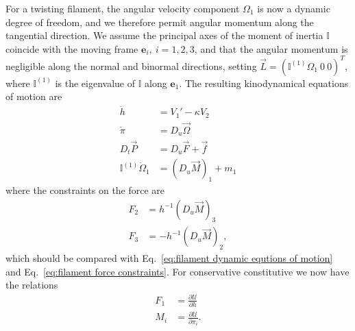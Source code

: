 For a twisting filament, the angular velocity component $\Omega_1$ is now a dynamic degree of freedom, and we therefore permit angular momentum along the tangential direction. We assume the principal axes of the moment of inertia $\mathbb{I}$ coincide with the moving frame $\mathbf{e}_i,\ i=1,2,3$, and that the angular momentum is negligible along the normal and binormal directions, setting $\vec{L} = ( \mathbb{I}^{(1)} \Omega_1\ 0\ 0 )^T$, where $\mathbb{I}^{(1)}$ is the eigenvalue of $\mathbb{I}$ along $\mathbf{e}_1$. The resulting kinodynamical equations of motion are
\begin{subequations} \label{eq:twisting filament dynamic equtions of motion}
\begin{align}
\dot{h} & = V_1' - \kappa V_2 \\
\dot{\pi} & = D_u \vec{\Omega} \\
D_t \vec{P} & = D_u \vec{F} + \vec{f} \\
\mathbb{I}^{(1)} \dot{\Omega}_1 & = (D_u \vec{M})_1 + m_1
\end{align}
\end{subequations}
where the constraints on the force are
\begin{subequations} \label{eq:twisting filament force constraints}
\begin{align}
F_2 & = h^{-1} (D_u \vec{M})_3 \\
F_3 & = - h^{-1} (D_u \vec{M})_2,
\end{align}
\end{subequations}
which should be compared with Eq.~\ref{eq:filament dynamic equtions of motion} and Eq.~\ref{eq:filament force constraints}. For conservative constitutive we now have the relations
\begin{subequations} \label{eq:F1 and M for twisting filament}
\begin{align}
F_1 & =  \frac{\partial \mathcal{U}}{\partial h} \\
M_i & =  \frac{\partial \mathcal{U}}{\partial \pi_i}.
\end{align}
\end{subequations}


